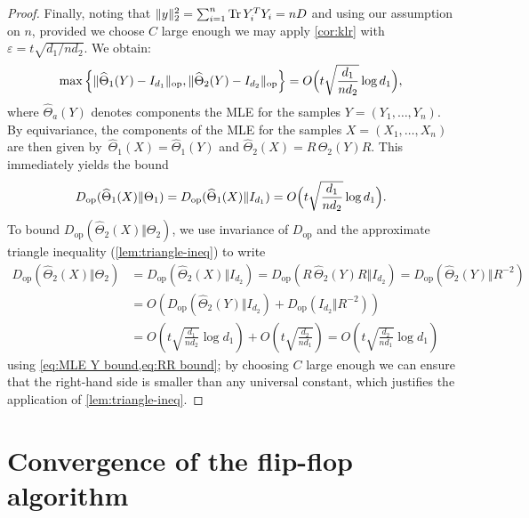\documentclass[aos]{imsart}
\theoremstyle{definition}
\numberwithin{equation}{section}
\DeclareMathOperator{\op}{op}
\DeclareMathOperator{\tr}{Tr}
\DeclarePairedDelimiter{\norm}{\lVert}{\rVert}
\newcommand{\htheta}{\widehat{\Theta}}
\newcommand{\eps}{\varepsilon}
\newcommand{\Dop}{D_{\operatorname{op}}}
\begin{document}
\begin{proof}
Finally, noting that $\norm{y}_2^2 = \sum_{i=1}^n \tr Y_i^T Y_i = nD$ and using our assumption on $n$, provided we choose $C$ large enough we may apply \cref{cor:klr} with $\eps = t\sqrt{d_1/nd_2}$.
We obtain:
\begin{align}\label{eq:MLE Y bound}
  \max \, \Bigl\{ \norm{\htheta_1(Y) - I_{d_1}}_{\op}, \norm{\htheta_2(Y) - I_{d_2}}_{\op} \Bigr\}
= O\Bigl(t\sqrt{\frac{d_1}{nd_2}} \log d_1\Bigr),
\end{align}
where $\htheta_a(Y)$ denotes components the MLE for the samples $Y=(Y_1,\dots,Y_n)$.
By equivariance, the components of the MLE for the samples $X=(X_1,\dots,X_n)$ are then given by~$\htheta_1(X) = \htheta_1(Y)$ and $\htheta_2(X) = R \, \htheta_2(Y) R$.
This immediately yields the bound
\begin{align*}
  \Dop(\htheta_1(X)\Vert\Theta_1)
= \Dop(\htheta_1(X)\Vert I_{d_1})
= O\Bigl(t\sqrt{\frac{d_1}{nd_2}} \log d_1\Bigr).
\end{align*}
To bound $\Dop(\htheta_2(X)\Vert\Theta_2)$, we use invariance of $\Dop$ and the approximate triangle inequality (\cref{lem:triangle-ineq}) to write
\begin{align*}
  \Dop(\htheta_2(X)\Vert\Theta_2)
&= \Dop(\htheta_2(X)\Vert I_{d_2})
= \Dop(R \, \htheta_2(Y) R\Vert I_{d_2})
= \Dop(\htheta_2(Y)\Vert R^{-2}) \\
&= O\left(\Dop(\htheta_2(Y)\Vert I_{d_2}) + \Dop(I_{d_2}\Vert R^{-2})\right) \\
&= O\left(t\sqrt{\frac{d_1}{nd_2}} \log d_1\right)
+ O\left(t\sqrt{\frac{d_2}{nd_1}}\right)
= O\left(t\sqrt{\frac{d_2}{nd_1}} \log d_1\right)
\end{align*}
using \cref{eq:MLE Y bound,eq:RR bound}; by choosing $C$ large enough we can ensure that the right-hand side is smaller than any universal constant, which justifies the application of \cref{lem:triangle-ineq}.
\end{proof}

\section{Convergence of the flip-flop algorithm}\label{sec:flipflop}
\end{document}
